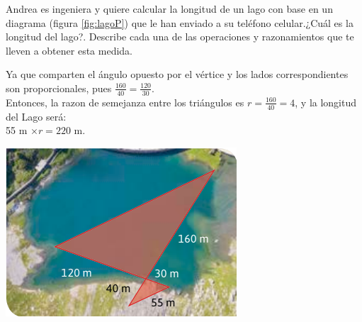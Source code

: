 \question[10] Andrea es ingeniera y quiere calcular la longitud de un lago con base en un diagrama (figura \ref{fig:lagoP}) que le han
enviado a su teléfono celular.¿Cuál es la longitud del lago?. Describe cada una de las
operaciones y razonamientos que te lleven a obtener esta medida.

\begin{minipage}{\textwidth}
    \begin{minipage}{0.45\textwidth}
        \begin{solutionbox}{6cm}
            Ya que comparten el ángulo opuesto por el vértice y los lados correspondientes son proporcionales, pues $\frac{160}{40} = \frac{120}{30}$.\\
            Entonces, la razon de semejanza entre los tri\'angulos es $r=\frac{160}{40}=4$, y la longitud del Lago ser\'a: \\ 55 m $\times r=220$ m.
        \end{solutionbox}
    \end{minipage}\hfill
    \begin{minipage}{0.45\textwidth}
        \includegraphics[width=0.9\linewidth]{Images/lagoP}
        \label{fig:lagoP}
    \end{minipage}
\end{minipage}